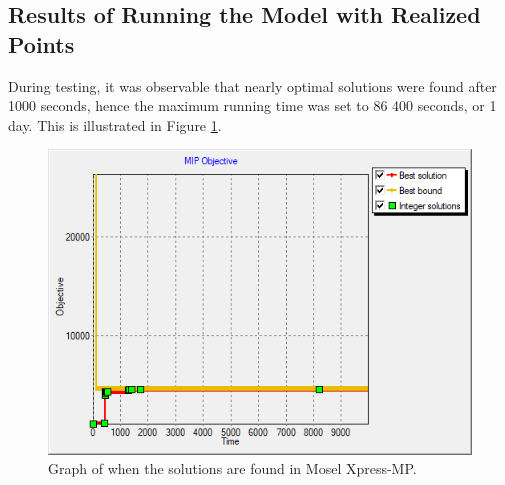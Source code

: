 \subsection{Results of Running the Model with Realized Points}

During testing, it was observable that nearly optimal solutions were found after 1000 seconds, hence the maximum running time was set to 86 400 seconds, or 1 day. This is illustrated in Figure \ref{fig:solutions_found_realized_points}. 

\begin{figure}[H]
    \centering
    \includegraphics[scale=0.50]{fig/chapter_7/solution_found_edit_zoom_1.png}
    \caption{Graph of when the solutions are found in Mosel Xpress-MP.}
    \label{fig:solutions_found_realized_points}
\end{figure}



